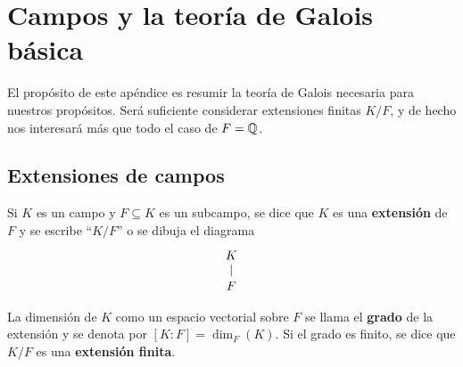 \chapter{Campos y la teoría de Galois básica}
\label{ap:teoria-de-Galois}

El propósito de este apéndice es resumir la teoría de Galois necesaria para
nuestros propósitos. Será suficiente considerar extensiones finitas $K/F$,
y de hecho nos interesará más que todo el caso de $F = \mathbb{Q}$.


\section{Extensiones de campos}

\begin{definicion}
  Si $K$ es un campo y $F \subseteq K$ es un subcampo, se dice que $K$ es una
  \textbf{extensión} de $F$ y se escribe ``$K/F$'' o se dibuja el diagrama
  \[ \begin{tikzcd}[row sep=1em]
    K\ar[-]{d} \\
    F
  \end{tikzcd} \]

  La dimensión de $K$ como un espacio vectorial sobre $F$ se llama el
  \textbf{grado} de la extensión y se denota por $[K : F] = \dim_F (K)$.
  Si el grado es finito, se dice que $K/F$ es una \textbf{extensión finita}.
\end{definicion}

